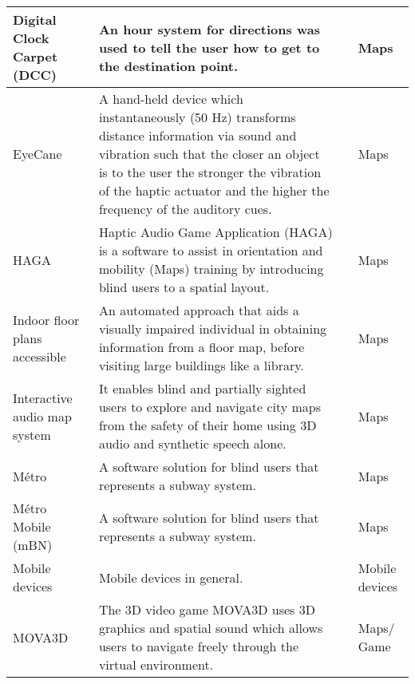 \begin{small}
\begin{longtable}[h]{m{2.7cm}m{7cm}m{3cm}m{2cm}}
            Digital Clock Carpet (DCC) & An hour system for directions was used to tell the user how to get to the destination point. & {\tiny \cite{Sanchez2010b}} & Maps \\ \hline
            
            EyeCane & A hand-held device which instantaneously (50 Hz) transforms distance information via sound and vibration such that the closer an object is to the user the stronger the vibration of the haptic actuator and the higher the frequency of the auditory cues. & {\tiny \cite{Buchs2017}} & Maps \\ \hline
            
            HAGA & Haptic Audio Game Application (HAGA) is a software to assist in orientation and mobility (Maps) training by introducing blind users to a spatial layout. & {\tiny \cite{Merabet2016}} & Maps \\ \hline
            
            Indoor floor plans accessible & An automated approach that aids a visually impaired individual in obtaining information from a floor map, before visiting large buildings like a library. & {\tiny \cite{Paladugu2015}} & Maps \\ \hline
            
            Interactive audio map system & It enables blind and partially sighted users to explore and navigate city maps from the safety of their home using 3D audio and synthetic speech alone. & {\tiny \cite{Stojmenovic2014}} & Maps \\ \hline
            
            Métro & A software solution for blind users that represents a subway system. & {\tiny \cite{Sanchezb}} & Maps \\ \hline
            
            Métro Mobile (mBN) & A software solution for blind users that represents a subway system. & {\tiny \cite{Sanchezb}} & Maps \\ \hline
            
            Mobile devices & Mobile devices in general. & {\tiny \cite{Guerreiro2011}} & Mobile devices \\ \hline
            
            MOVA3D & The 3D video game MOVA3D uses 3D graphics and spatial sound which allows users to navigate freely through the virtual environment. & {\tiny \cite{Sanchez2010b}} & Maps$/$Game \\ \hline
            

\end{longtable}
\end{small}
